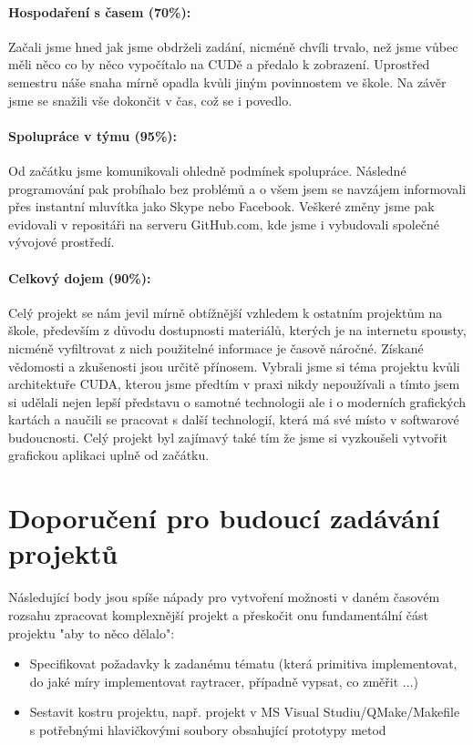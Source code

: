 \documentclass[12pt,a4paper,titlepage,final]{report}
\begin{document}
\paragraph{Hospodaření s časem (70\%):}
Začali jsme hned jak jsme obdrželi zadání, nicméně chvíli trvalo, než jsme vůbec měli něco co by něco vypočítalo na CUDě a předalo k zobrazení. Uprostřed semestru náše snaha mírně opadla kvůli jiným povinnostem ve škole. Na závěr jsme se snažili vše dokončit v čas, což se i povedlo.

\paragraph{Spolupráce v týmu (95\%):}
Od začátku jsme komunikovali ohledně podmínek spolupráce. Následné programování pak probíhalo bez problémů a o všem jsem se navzájem informovali přes instantní mluvítka jako Skype nebo Facebook. Veškeré změny jsme pak evidovali v repositáři na serveru GitHub.com, kde jsme i vybudovali společné vývojové prostředí.

\paragraph{Celkový dojem (90\%):} 
Celý projekt se nám jevil mírně obtížnější vzhledem k ostatním projektům na škole, především z důvodu dostupnosti materiálů, kterých je na internetu spousty, nicméně vyfiltrovat z nich použitelné informace je časově náročné. 
Získané vědomosti a zkušenosti jsou určitě přínosem. 
Vybrali jsme si téma projektu kvůli architektuře CUDA, kterou jsme předtím v praxi nikdy nepoužívali a tímto jsem si udělali nejen lepší představu o samotné technologii ale i o moderních grafických kartách a naučili se pracovat s další technologií, která má své místo v softwarové budoucnosti. Celý projekt byl zajímavý také tím že jsme si vyzkoušeli vytvořit grafickou aplikaci uplně od začátku.
\section{Doporučení pro budoucí zadávání projektů}

Následující body jsou spíše nápady pro vytvoření možnosti v daném časovém rozsahu zpracovat komplexnější projekt a přeskočit onu fundamentální část projektu "aby to něco dělalo":
\begin{itemize}
	\item Specifikovat požadavky k zadanému tématu (která primitiva implementovat, do jaké míry implementovat raytracer, případně vypsat, co změřit ...)
	\item Sestavit kostru projektu, např. projekt v MS Visual Studiu/QMake/Makefile s potřebnými hlavičkovými soubory obsahující prototypy metod
\end{itemize}

\end{document}
